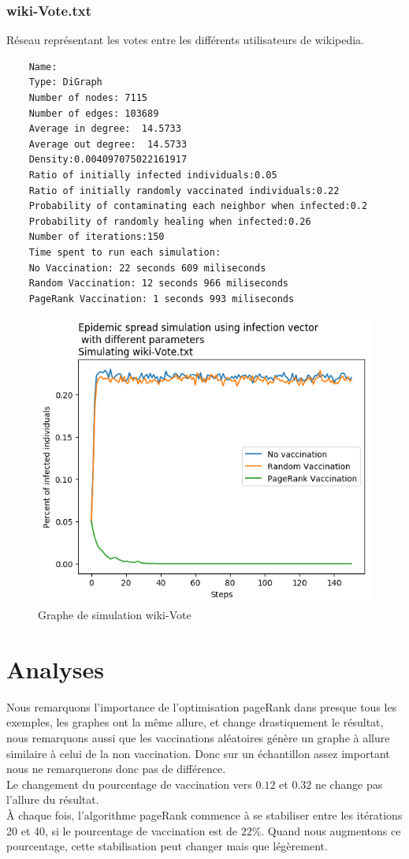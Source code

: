 \documentclass{report}
\begin{document}
\subsubsection{wiki-Vote.txt}
Réseau représentant les votes entre les différents utilisateurs de wikipedia.
\begin{tcolorbox}
  \begin{verbatim}
    Name:
    Type: DiGraph
    Number of nodes: 7115
    Number of edges: 103689
    Average in degree:  14.5733
    Average out degree:  14.5733
    Density:0.004097075022161917
    Ratio of initially infected individuals:0.05
    Ratio of initially randomly vaccinated individuals:0.22
    Probability of contaminating each neighbor when infected:0.2
    Probability of randomly healing when infected:0.26
    Number of iterations:150
    Time spent to run each simulation:
    No Vaccination: 22 seconds 609 miliseconds
    Random Vaccination: 12 seconds 966 miliseconds
    PageRank Vaccination: 1 seconds 993 miliseconds
  \end{verbatim}
\end{tcolorbox}
\begin{figure}[ht!]
  \centering
  \includegraphics[scale=0.7]{../plots/wiki-Vote.png}
  \caption{Graphe de simulation wiki-Vote}
\end{figure}
\section{Analyses}
Nous remarquons l'importance de l'optimisation pageRank dans presque tous les exemples, les graphes
ont la même allure, et change drastiquement le résultat, nous remarquons aussi que les vaccinations
aléatoires génère un graphe à allure similaire à celui de la non vaccination. Donc sur un échantillon
assez important nous ne remarquerons donc pas de différence.\\
Le changement du pourcentage de vaccination vers $0.12$ et $0.32$ ne change pas l'allure du résultat.\\
À chaque fois, l'algorithme pageRank commence à se stabiliser entre les itérations 20 et 40, si
le pourcentage de vaccination est de $22\%$. Quand nous augmentons ce pourcentage, cette stabilisation
peut changer mais que légèrement.
\end{document}
